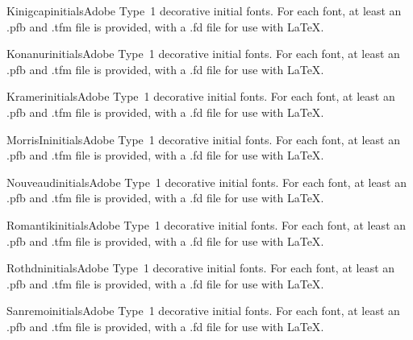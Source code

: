 \documentclass{ddltxtyp}
\begin{document}
\begin{package}{Kinigcap}{initials}{Adobe Type~1 decorative initial fonts.}
For each font, at least an .pfb and .tfm file is provided, with
a .fd file for use with {\LaTeX}.
\end{package}
\begin{package}{Konanur}{initials}{Adobe Type~1 decorative initial fonts.}
For each font, at least an .pfb and .tfm file is provided, with
a .fd file for use with {\LaTeX}.
\end{package}
\begin{package}{Kramer}{initials}{Adobe Type~1 decorative initial fonts.}
For each font, at least an .pfb and .tfm file is provided, with
a .fd file for use with {\LaTeX}.
\end{package}
\begin{package}{MorrisIn}{initials}{Adobe Type~1 decorative initial fonts.}
For each font, at least an .pfb and .tfm file is provided, with
a .fd file for use with {\LaTeX}.
\end{package}
\begin{package}{Nouveaud}{initials}{Adobe Type~1 decorative initial fonts.}
For each font, at least an .pfb and .tfm file is provided, with
a .fd file for use with {\LaTeX}.
\end{package}
\begin{package}{Romantik}{initials}{Adobe Type~1 decorative initial fonts.}
For each font, at least an .pfb and .tfm file is provided, with
a .fd file for use with {\LaTeX}.
\end{package}
\begin{package}{Rothdn}{initials}{Adobe Type~1 decorative initial fonts.}
For each font, at least an .pfb and .tfm file is provided, with
a .fd file for use with {\LaTeX}.
\end{package}
\begin{package}{Sanremo}{initials}{Adobe Type~1 decorative initial fonts.}
For each font, at least an .pfb and .tfm file is provided, with
a .fd file for use with {\LaTeX}.
\end{package}
\end{document}
